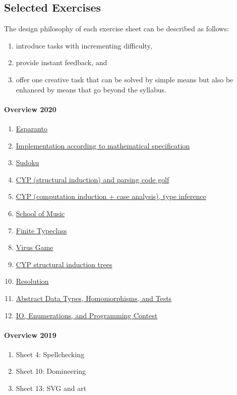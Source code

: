 \subsection{Selected Exercises}

The design philosophy of each exercise sheet
can be described as follows:
\begin{enumerate}
  \item introduce tasks with incrementing difficulty,
  \item provide instant feedback, and
  \item offer one creative task that can be solved by simple means but also be enhanced by means that go beyond the syllabus.
\end{enumerate}


\paragraph{Overview 2020}
\begin{enumerate}
\item \href{https://www21.in.tum.de/teaching/fpv/WS20/assets/ex01.pdf}{Esparanto}
\item \href{https://www21.in.tum.de/teaching/fpv/WS20/assets/ex02.pdf}{Implementation according to mathematical specification}
\item \href{https://www21.in.tum.de/teaching/fpv/WS20/assets/ex03.pdf}{Sudoku}
\item \href{https://www21.in.tum.de/teaching/fpv/WS20/assets/ex04.pdf}{CYP (structural induction) and parsing code golf}
\item \href{https://www21.in.tum.de/teaching/fpv/WS20/assets/ex05.pdf}{CYP (computation induction + case analysis), type inference}
\item \href{https://www21.in.tum.de/teaching/fpv/WS20/assets/ex06.pdf}{School of Music}
\item \href{https://www21.in.tum.de/teaching/fpv/WS20/assets/ex07.pdf}{Finite Typeclass}
\item \href{https://www21.in.tum.de/teaching/fpv/WS20/assets/ex08.pdf}{Virus Game}
\item \href{https://www21.in.tum.de/teaching/fpv/WS20/assets/ex09.pdf}{CYP structural induction trees}
\item \href{https://www21.in.tum.de/teaching/fpv/WS20/assets/ex10.pdf}{Resolution}
\item \href{https://www21.in.tum.de/teaching/fpv/WS20/assets/ex11.pdf}{Abstract Data Types, Homomorphisms, and Tests}
\item \href{https://www21.in.tum.de/teaching/fpv/WS20/assets/ex12.pdf}{IO, Enumerations, and Programming Contest}
\end{enumerate}

\paragraph{Overview 2019}
\begin{enumerate}
\item Sheet 4: Spellchecking
\item Sheet 10: Domineering
\item Sheet 13: SVG and art
\end{enumerate}
